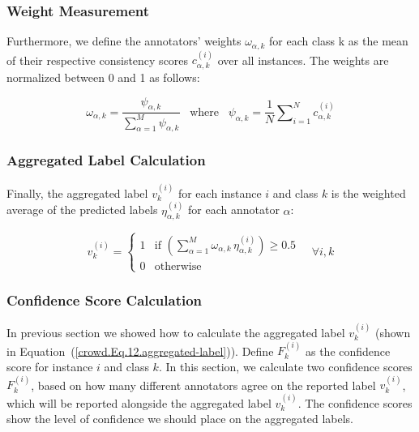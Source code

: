 \subsubsection{Weight Measurement}

Furthermore, we define the annotators' weights $\omega_{\alpha,k}$ for each class k as the mean of their respective consistency scores $c_{\alpha,k}^{(i)} $ over all instances. The weights are normalized between 0 and 1 as follows:

\begin{equation}
    \omega_{\alpha,k}=\frac{\psi_{\alpha,k}}{\sum_{\alpha=1}^ M\psi_{\alpha,k}}\;\;\;\text{where}\;\;\; \psi_{\alpha,k}=\frac1N\sum\nolimits_{i=1}^{N}c_{\alpha,k}^{(i)}
    \label{crowd.Eq.11.weights}
\end{equation}

\subsubsection{Aggregated Label Calculation}

Finally, the aggregated label $v_k^{(i)} $ for each instance $i $ and class $k $ is the weighted average of the predicted labels $\eta_{\alpha,k}^{(i)} $ for each annotator $\alpha $:

\begin{equation}
    v_k^{(i)} =
    \begin{cases}
        1 & \text{if } \left(\sum_{\alpha=1}^{M} \omega_{\alpha,k}\, \eta_{\alpha,k}^{(i)}\right) \geq 0.5 \\
        0 & \text{otherwise}
    \end{cases}
    \quad \forall i, k
    \label{crowd.Eq.12.aggregated-label}
\end{equation}

\subsubsection{Confidence Score Calculation}

In previous section we showed how to calculate the aggregated label $v_k^{(i)} $ (shown in Equation~(\ref{crowd.Eq.12.aggregated-label})). Define $F_k^{(i)} $ as the confidence score for instance $i $ and class $k $. In this section, we calculate two confidence scores $F_k^{(i)} $, based on how many different annotators agree on the reported label $v_k^{(i)} $, which will be reported alongside the aggregated label $v_k^{(i)} $. The confidence scores show the level of confidence we should place on the aggregated labels.


